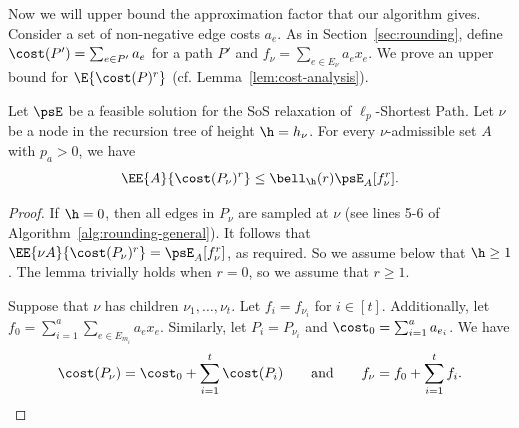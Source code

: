\documentclass[11pt,a4paper]{article}
\begin{document}
Now we will upper bound the approximation factor that our algorithm gives.
Consider a set of non-negative edge costs $a_e$. As in Section~\ref{sec:rounding}, define $\cost(P') = \sum_{e\in P'} a_e$ for a path $P'$ and $f_{\nu} = \sum_{e\in E_\nu} a_e x_e$. 
We prove an upper bound for $\E{\cost(P)^r}$ (cf. Lemma~\ref{lem:cost-analysis}). 
\begin{lemma}\label{lem:cost-analysis-layered}
Let $\psE$ be a feasible solution for the SoS relaxation of $\ell_p$-Shortest Path. Let $\nu$ be a node in the recursion tree of height $\h=h_\nu$. For every $\nu$-admissible set $A$ with $p_a > 0$, we have
$$
\EE{A}{\cost(P_\nu)^{r}} \leq \bell_{\h}(r) \psE_A[f_\nu^{r}]. 
$$
\end{lemma}
\begin{proof}
If $\h=0$, then all edges in $P_\nu$ are sampled at $\nu$ (see lines 5-6 of Algorithm~\ref{alg:rounding-general}). It follows that $\EE{\nu A}{\cost(P_\nu)^{r}} = \psE_A[f_\nu^{r}]$, as required. So we assume below that $\h \geq 1$. The lemma trivially holds when $r = 0$, so we assume that $r\geq 1$.

Suppose that $\nu$ has children $\nu_1,\dots, \nu_t$. Let  $f_i = f_{\nu_i}$ for $i\in [t]$. Additionally, let $f_0 = \sum_{i=1}^a\sum_{e\in E_{m_i}} a_e x_{e}$. 
Similarly, let $P_i = P_{\nu_i}$ and $\cost_0 = \sum_{i=1}^a a_{e_i}$.
We have
$$
\cost(P_\nu) = \cost_0 + \sum_{i=1}^t \cost(P_i)\qquad\text{and}\qquad f_\nu = f_0 + \sum_{i=1}^t f_i.
$$


\end{proof}
\end{document}
